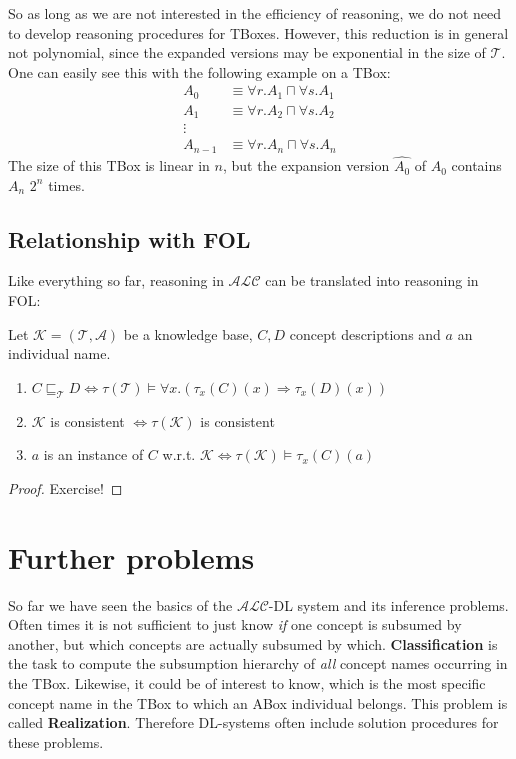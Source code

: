 So as long as we are not interested in the efficiency of reasoning, we do not need to develop reasoning procedures for TBoxes.
However, this reduction is in general not polynomial, since the expanded versions may be exponential in the size of $\mathcal{T}$.
One can easily see this with the following example on a TBox:
\begin{align*}
	A_0 &\equiv \forall r.A_1 \sqcap \forall s. A_1 \\
	A_1 &\equiv \forall r.A_2 \sqcap \forall s.A_2 \\
	\vdots & \\
	A_{n-1} & \equiv \forall r.A_n \sqcap \forall s.A_{n}
\end{align*}
The size of this TBox is linear in $n$,
but the expansion version $\widehat{A_0}$ of $A_0$ contains $A_n$ $2^n$ times. 

\subsection{Relationship with FOL}
Like everything so far, reasoning in $\mathcal{ALC}$ can be translated into reasoning in FOL:
\begin{lemma}
	Let $\mathcal{K} = ( \mathcal{T},\mathcal{A})$ be a knowledge base, $C,D$ concept descriptions and $a$ an individual name.
	\begin{enumerate}
		\item $C \sqsubseteq_{\mathcal{T}} D \iff \tau(\mathcal{T}) \vDash \forall x.(\tau_x(C)(x) \Rightarrow \tau_x(D)(x))$
		\item $ \mathcal{K}$ is consistent $ \iff \tau(\mathcal{K})$ is consistent
		\item $a$ is an instance of $C$ w.r.t. $\mathcal{K} \iff \tau \left( \mathcal{K} \right) \vDash \tau_x(C)(a)$
	\end{enumerate}
\end{lemma}

\begin{proof}
	Exercise!	
\end{proof}

\section{Further problems}
So far we have seen the basics of the $\mathcal{ALC}$-DL system and its inference problems.
Often times it is not sufficient to just know \textit{if} one concept is subsumed by another,
but which concepts are actually subsumed by which.
\textbf{Classification} is the task to compute the subsumption hierarchy of \textit{all} concept names occurring in the TBox.
\newline
Likewise, it could be of interest to know, which is the most specific concept name in the TBox to which an ABox individual belongs.
This problem is called \textbf{Realization}.
\newline
Therefore DL-systems often include solution procedures for these problems.

